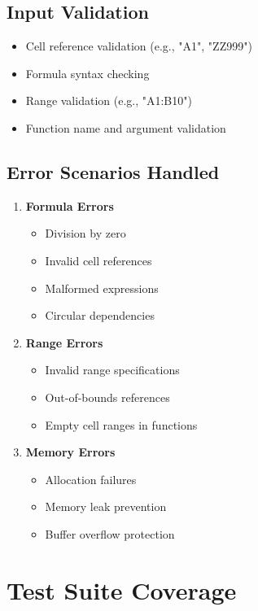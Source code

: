 \documentclass{article}
\begin{document}
\subsection{Input Validation}
\begin{itemize}
    \item Cell reference validation (e.g., "A1", "ZZ999")
    \item Formula syntax checking
    \item Range validation (e.g., "A1:B10")
    \item Function name and argument validation
\end{itemize}

\subsection{Error Scenarios Handled}
\begin{enumerate}
    \item \textbf{Formula Errors}
    \begin{itemize}
        \item Division by zero
        \item Invalid cell references
        \item Malformed expressions
        \item Circular dependencies
    \end{itemize}

    \item \textbf{Range Errors}
    \begin{itemize}
        \item Invalid range specifications
        \item Out-of-bounds references
        \item Empty cell ranges in functions
    \end{itemize}

    \item \textbf{Memory Errors}
    \begin{itemize}
        \item Allocation failures
        \item Memory leak prevention
        \item Buffer overflow protection
    \end{itemize}
\end{enumerate}

\section{Test Suite Coverage}
\end{document}
